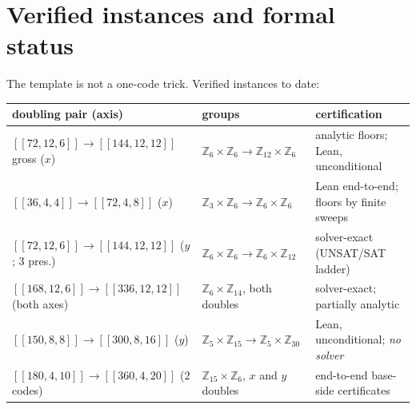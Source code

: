 \documentclass[11pt]{article}
\theoremstyle{plain}
\theoremstyle{definition}
\theoremstyle{remark}
\newcommand{\Z}{\mathbb{Z}}
\begin{document}
\section{Verified instances and formal status}
\label{sec:instances}

The template is not a one-code trick. Verified instances to date:

\begin{center}
\footnotesize
\begin{tabular}{lll}
\toprule
doubling pair (axis) & groups & certification\\
\midrule
$[[72,12,6]] \to [[144,12,12]]$ gross ($x$) &
$\Z_6{\times}\Z_6 \to \Z_{12}{\times}\Z_6$ &
analytic floors; Lean, unconditional\\
$[[36,4,4]] \to [[72,4,8]]$ ($x$) &
$\Z_3{\times}\Z_6 \to \Z_6{\times}\Z_6$ &
Lean end-to-end; floors by finite sweeps\\
$[[72,12,6]] \to [[144,12,12]]$ ($y$; 3 pres.) &
$\Z_6{\times}\Z_6 \to \Z_6{\times}\Z_{12}$ &
solver-exact (UNSAT/SAT ladder)\\
$[[168,12,6]] \to [[336,12,12]]$ (both axes) &
$\Z_6{\times}\Z_{14}$, both doubles &
solver-exact; partially analytic\\
$[[150,8,8]] \to [[300,8,16]]$ ($y$) &
$\Z_5{\times}\Z_{15} \to \Z_5{\times}\Z_{30}$ &
Lean, unconditional; \emph{no solver}\\
$[[180,4,10]] \to [[360,4,20]]$ (2 codes) &
$\Z_{15}{\times}\Z_6$, $x$ and $y$ doubles &
end-to-end base-side certificates\\
\bottomrule
\end{tabular}
\end{center}
\end{document}
